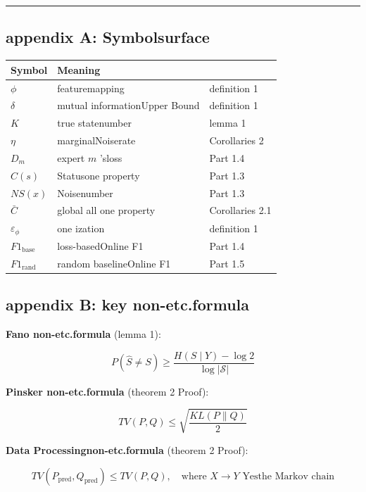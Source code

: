 \documentclass[
  12pt,
]{article}
\begin{document}
\begin{center}\rule{0.5\linewidth}{0.5pt}\end{center}

\subsection{appendix A: Symbolsurface}\label{ux9644ux5f55-aux7b26ux53f7ux8868}

\begin{longtable}[]{@{}lll@{}}
\toprule\noalign{}
Symbol & Meaning &  \\
\midrule\noalign{}
\endhead
\bottomrule\noalign{}
\endlastfoot
\(\phi\) & featuremapping & definition  1 \\
\(\delta\) & mutual informationUpper Bound & definition  1 \\
\(K\) & true statenumber  & lemma  1 \\
\(\eta\) & marginalNoiserate  & Corollaries 2 \\
\(D_m\) & expert  \(m\) 'sloss & Part 1.4  \\
\(C(s)\) & Statusone property  & Part 1.3  \\
\(NS(x)\) & Noisenumber  & Part 1.3  \\
\(\bar{C}\) & global all one property  & Corollaries 2.1 \\
\(\varepsilon_\phi\) & one ization  & definition  1 \\
\(F1_{\text{base}}\) & loss-basedOnline  F1 & Part 1.4  \\
\(F1_{\text{rand}}\) & random baselineOnline  F1 & Part 1.5  \\
\end{longtable}

\subsection{appendix
B: key non-etc.formula }\label{ux9644ux5f55-bux5173ux952eux4e0dux7b49ux5f0f}

\textbf{Fano non-etc.formula }(lemma  1):

\[P(\hat{S} \neq S) \geq \frac{H(S \mid Y) - \log 2}{\log |\mathcal{S}|}\]

\textbf{Pinsker non-etc.formula }(theorem  2 Proof):

\[TV(P, Q) \leq \sqrt{\frac{KL(P \parallel Q)}{2}}\]

\textbf{Data Processingnon-etc.formula }(theorem  2 Proof):

\[TV(P_{\text{pred}}, Q_{\text{pred}}) \leq TV(P, Q), \quad \text{where } X \to Y \text{ Yesthe Markov chain}\]
\end{document}

